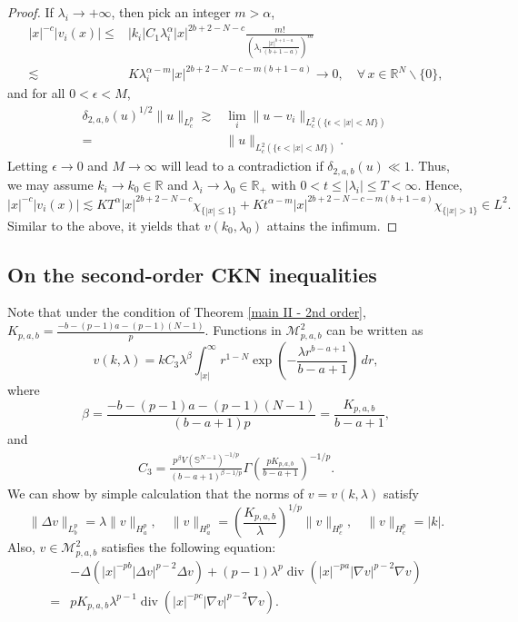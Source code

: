 \documentclass[11pt]{article}
\DeclareMathOperator{\Div}{div}
\newcommand{\R}{\mathbb{R}}
\numberwithin{equation}{section}
\begin{document}
\begin{proof}
    If $\lambda_i\to +\infty$, then pick an integer $m>\alpha$,
    \begin{align*}
        |x|^{-c} |v_i(x)| \le{}& |k_i|C_1\lambda_i^\alpha |x|^{2b+2-N-c}\frac{m!}{\left(\lambda_i\frac{|x|^{b+1-a}}{(b+1-a)} \right)^m} \\
        \lesssim{}& K\lambda_i^{\alpha-m} |x|^{2b+2-N-c-m(b+1-a)} \to 0,\quad \forall\, x\in \R^N\backslash\{0\},
    \end{align*}
    and for all $0<\epsilon<M$,
    \begin{align*}
        \delta_{2,a,b}(u)^{1/2}\|u\|_{L^p_c} \gtrsim{}& \lim_i \|u-v_i\|_{L^2_c(\{\epsilon<|x|<M\})}\\
        ={}& \|u\|_{L^2_c(\{\epsilon<|x|<M \})}.
    \end{align*}
    Letting $\epsilon\to 0$ and $M\to \infty$ will lead to a contradiction if $\delta_{2,a,b}(u) \ll 1$. Thus, we may assume $k_i\to k_0\in\R$ and $\lambda_i\to \lambda_0\in\R_+$ with $0<t\le |\lambda_i|\le T<\infty$. Hence,
    \[ |x|^{-c}|v_i(x)| \lesssim KT^\alpha |x|^{2b+2-N-c}\chi_{\{|x|\le 1\}} + Kt^{\alpha-m} |x|^{2b+2-N-c-m(b+1-a)}\chi_{\{|x|>1\}}\in L^2.\]
    Similar to the above, it yields that $v(k_0,\lambda_0)$ attains the infimum.
\end{proof}

\subsection{On the second-order CKN inequalities}
Note that under the condition of Theorem \ref{main II - 2nd order}, $K_{p,a,b}=\frac{-b-(p-1)a-(p-1)(N-1)}{p}$. Functions in $\mathcal{M}_{p,a,b}^2$ can be written as
\[ v(k,\lambda) = k C_3 \lambda^\beta \int_{|x|}^\infty r^{1-N}\exp\left(-\frac{\lambda r^{b-a+1}}{b-a+1}\right)\,dr,\]
where
\[ \beta = \frac{-b-(p-1)a-(p-1)(N-1)}{(b-a+1)p} = \frac{K_{p,a,b}}{b-a+1},\]
and
\begin{align*}
    C_3 = \frac{p^\beta V(\mathbb{S}^{N-1})^{-1/p}}{(b-a+1)^{\beta-1/p}}\Gamma\left(\frac{pK_{p,a,b}}{b-a+1}\right)^{-1/p}.
\end{align*}
We can show by simple calculation that the norms of $v=v(k,\lambda)$ satisfy
\begin{equation}\label{norm of v 2nd}
    \|\Delta v\|_{L^{p}_b} = \lambda \|v\|_{H^p_a},\quad \|v\|_{H^p_a} = \left(\frac{K_{p,a,b}}{\lambda}\right)^{1/p}\|v\|_{H^p_c},\quad \|v\|_{H_c^p} = |k|.
\end{equation}
Also, $v\in \mathcal{M}_{p,a,b}^2$ satisfies the following equation:
\begin{equation}\label{eq2}
    \begin{aligned}
        & -\Delta(|x|^{-pb}|\Delta v|^{p-2}\Delta v) + (p-1)\lambda^p\Div(|x|^{-pa}|\nabla v|^{p-2}\nabla v)\\
        ={}& pK_{p,a,b}\lambda^{p-1}\Div(|x|^{-pc}|\nabla v|^{p-2}\nabla v).
    \end{aligned}
\end{equation}
\end{document}

